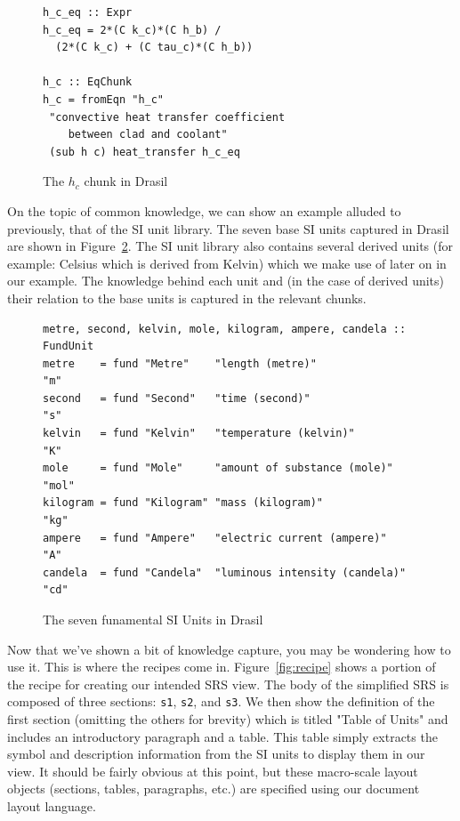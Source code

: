 \documentclass[preprint, 10pt]{sigplanconf}
\begin{document}
\begin{figure}
\begin{lstlisting}[frame=single, showstringspaces=false, basicstyle=\small]
h_c_eq :: Expr
h_c_eq = 2*(C k_c)*(C h_b) /
  (2*(C k_c) + (C tau_c)*(C h_b))

h_c :: EqChunk
h_c = fromEqn "h_c" 
 "convective heat transfer coefficient
    between clad and coolant"
 (sub h c) heat_transfer h_c_eq
\end{lstlisting}
\caption{The $h_c$ chunk in Drasil}
\label{fig:h_cChunk}
\end{figure}

On the topic of common knowledge, we can show an example alluded to previously,
that of the SI unit library. The seven base SI units captured in Drasil are
shown in Figure~\ref{fig:si_units}. The SI unit library also contains several
derived units (for example: Celsius which is derived from Kelvin) which we
make use of later on in our example. The knowledge behind each unit and (in the
case of derived units) their relation to the base units is captured in the
relevant chunks.

\begin{figure}
\begin{lstlisting}[frame=single, showstringspaces=false]
metre, second, kelvin, mole, kilogram, ampere, candela :: FundUnit
metre    = fund "Metre"    "length (metre)"               "m"
second   = fund "Second"   "time (second)"                "s"
kelvin   = fund "Kelvin"   "temperature (kelvin)"         "K"
mole     = fund "Mole"     "amount of substance (mole)"   "mol"
kilogram = fund "Kilogram" "mass (kilogram)"              "kg"
ampere   = fund "Ampere"   "electric current (ampere)"    "A"
candela  = fund "Candela"  "luminous intensity (candela)" "cd"
\end{lstlisting}
\caption{The seven funamental SI Units in Drasil}
\label{fig:si_units}
\end{figure}

Now that we've shown a bit of knowledge capture, you may be wondering how to use
it. This is where the recipes come in. Figure~\ref{fig:recipe} shows a portion
of the recipe for creating our intended SRS view. The body of the simplified SRS
is composed of three sections: \verb|s1|, \verb|s2|, and \verb|s3|. We then show
the definition of the first section (omitting the others for brevity) which is
titled "Table of Units" and includes an introductory paragraph and a table. This
table simply extracts the symbol and description information from the SI units
to display them in our view. It should be fairly obvious at this point, but
these macro-scale layout objects (sections, tables, paragraphs, etc.) are
specified using our document layout language.
\end{document}
